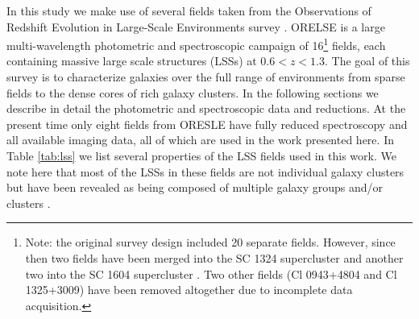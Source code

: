 \documentclass[a4paper,fleqn,usenatbib]{mnras}
\begin{document}
\renewcommand{\thefootnote}{\fnsymbol{footnote}}
In this study we make use of several fields taken from the Observations of Redshift Evolution in Large-Scale Environments survey \citep[ORELSE:][]{Lubin2009}.
ORELSE is a large multi-wavelength photometric and spectroscopic campaign of 16\footnote[2]{Note: the original survey design included 20 separate fields.
However, since then two fields have been merged into the SC 1324 supercluster and another two into the SC 1604 supercluster \citep[see Table 1 of][]{Lubin2009}.
Two other fields (Cl 0943+4804 and Cl 1325+3009) have been removed altogether due to incomplete data acquisition.}
fields, each containing massive large scale structures (LSSs) at $0.6 < z < 1.3$.
The goal of this survey is to characterize galaxies over the full range of environments from sparse fields to the dense cores of rich galaxy clusters.
In the following sections we describe in detail the photometric and spectroscopic data and reductions.
At the present time only eight fields from ORESLE have fully reduced spectroscopy and all available imaging data, all of which are used in the work presented here.
In Table \ref{tab:lss} we list several properties of the LSS fields used in this work.
We note here that most of the LSSs in these fields are not individual galaxy clusters but have been revealed as being composed of multiple galaxy groups and/or clusters \citep[see Section 2 of][]{Rumbaugh2017}.
\renewcommand{\thefootnote}{\arabic{footnote}}



\end{document}
